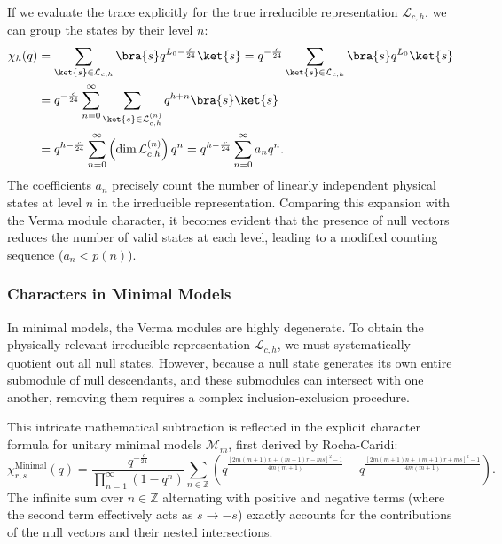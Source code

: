 If we evaluate the trace explicitly for the true irreducible representation \(\mathcal{L}_{c,h}\), we can group the states by their level \(n\):
\[
    \begin{aligned}
        \chi_h(q) & = \sum_{\ket{s} \in \mathcal{L}_{c,h}} \bra{s} q^{L_0 - \frac{c}{24}} \ket{s} = q^{-\frac{c}{24}} \sum_{\ket{s} \in \mathcal{L}_{c,h}} \bra{s} q^{L_0} \ket{s} \\
                  & = q^{-\frac{c}{24}} \sum_{n=0}^\infty \sum_{\ket{s} \in \mathcal{L}_{c,h}^{(n)}} q^{h+n} \bra{s}\ket{s}                                                        \\
                  & = q^{h - \frac{c}{24}} \sum_{n=0}^\infty \left( \dim \mathcal{L}_{c,h}^{(n)} \right) q^n = q^{h - \frac{c}{24}} \sum_{n=0}^\infty a_n q^n.
    \end{aligned}
\]
The coefficients \(a_n\) precisely count the number of linearly independent physical states at level \(n\) in the irreducible representation. Comparing this expansion with the Verma module character, it becomes evident that the presence of null vectors reduces the number of valid states at each level, leading to a modified counting sequence (\(a_n < p(n)\)).

\subsubsection{Characters in Minimal Models}

In minimal models, the Verma modules are highly degenerate. To obtain the physically relevant irreducible representation \(\mathcal{L}_{c,h}\), we must systematically quotient out all null states. However, because a null state generates its own entire submodule of null descendants, and these submodules can intersect with one another, removing them requires a complex inclusion-exclusion procedure.

This intricate mathematical subtraction is reflected in the explicit character formula for unitary minimal models \(\mathcal{M}_m\), first derived by Rocha-Caridi:
\[
    \chi_{r,s}^{\mathrm{Minimal}}(q) = \frac{q^{-\frac{c}{24}}}{\prod_{n=1}^\infty (1 - q^n)} \sum_{n \in \mathbb{Z}} \left( q^{\frac{[2m(m+1)n + (m+1)r - ms]^2 - 1}{4m(m+1)}} - q^{\frac{[2m(m+1)n + (m+1)r + ms]^2 - 1}{4m(m+1)}} \right).
\]
The infinite sum over \(n \in \mathbb{Z}\) alternating with positive and negative terms (where the second term effectively acts as \(s \to -s\)) exactly accounts for the contributions of the null vectors and their nested intersections.

